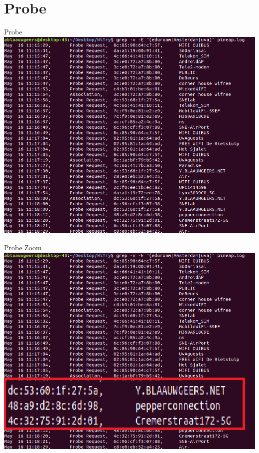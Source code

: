 \documentclass[10pt]{beamer}
\begin{document}
\section{Probe}
\begin{frame}{Probe}
\centering
\includegraphics[width=\textwidth]{probe.png}
\end{frame}

\begin{frame}{Probe Zoom}
\centering
\includegraphics[width=\textwidth]{probe2.png}
\end{frame}
\end{document}
